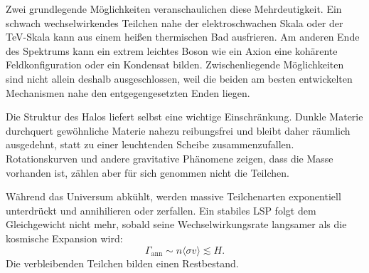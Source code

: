 Zwei grundlegende Möglichkeiten veranschaulichen diese Mehrdeutigkeit. Ein schwach wechselwirkendes Teilchen nahe der elektroschwachen Skala oder der TeV-Skala kann aus einem heißen thermischen Bad ausfrieren. Am anderen Ende des Spektrums kann ein extrem leichtes Boson wie ein Axion eine kohärente Feldkonfiguration oder ein Kondensat bilden. Zwischenliegende Möglichkeiten sind nicht allein deshalb ausgeschlossen, weil die beiden am besten entwickelten Mechanismen nahe den entgegengesetzten Enden liegen.

Die Struktur des Halos liefert selbst eine wichtige Einschränkung. Dunkle Materie durchquert gewöhnliche Materie nahezu reibungsfrei und bleibt daher räumlich ausgedehnt, statt zu einer leuchtenden Scheibe zusammenzufallen. Rotationskurven und andere gravitative Phänomene zeigen, dass die Masse vorhanden ist, zählen aber für sich genommen nicht die Teilchen.

\begin{classroomqa}
\end{classroomqa}

Während das Universum abkühlt, werden massive Teilchenarten exponentiell unterdrückt und annihilieren oder zerfallen. Ein stabiles LSP folgt dem Gleichgewicht nicht mehr, sobald seine Wechselwirkungsrate langsamer als die kosmische Expansion wird:
\begin{equation}
\Gamma_{\mathrm{ann}}
\sim n\langle\sigma v\rangle
\lesssim H.
\end{equation}
Die verbleibenden Teilchen bilden einen Restbestand.

